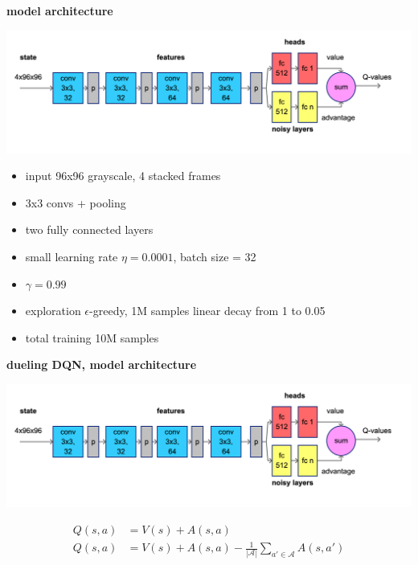 \documentclass[xcolor=dvipsnames]{beamer}
\begin{document}
\begin{frame}{\bf model architecture}

  {\centering \includegraphics[scale=0.15]{../diagrams/architectures/duelingdqn.png}}

  \begin{itemize}
    \item input 96x96 grayscale, 4 stacked frames
    \item 3x3 convs + pooling
    \item two fully connected layers
    \item small learning rate $\eta = 0.0001$, batch size = 32
    \item $\gamma = 0.99$
    \item exploration $\epsilon$-greedy, 1M samples linear decay from 1 to 0.05
    \item total training 10M samples
  \end{itemize}
 
\end{frame}


\begin{frame}{\bf dueling DQN, model architecture}

  {\centering \includegraphics[scale=0.15]{../diagrams/architectures/duelingdqn.png}}

  \begin{align*}
    Q(s, a) &= V(s) + A(s, a) \\
    Q(s, a) &= V(s) + A(s, a) - \frac{1}{|\mathcal{A}|}\sum_{a' \in \mathcal{A}}A(s, a')
  \end{align*}


\end{frame}
\end{document}
